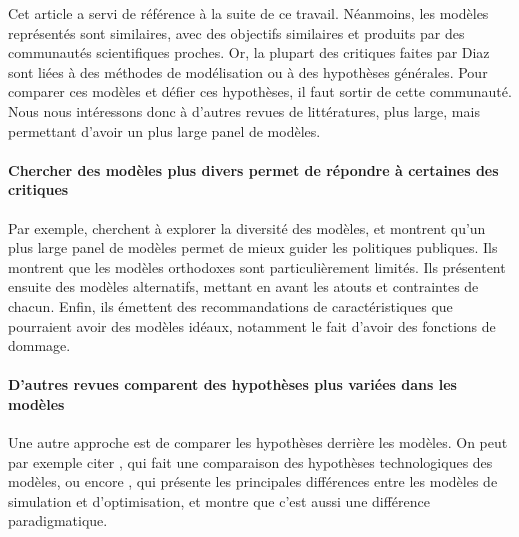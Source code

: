 Cet article a servi de référence à la suite de ce travail. Néanmoins, les modèles représentés sont similaires, avec des objectifs similaires et produits par des communautés scientifiques proches. Or, la plupart des critiques faites par Diaz sont liées à des méthodes de modélisation ou  à des hypothèses générales. Pour comparer ces modèles et défier ces hypothèses, il faut sortir de cette communauté.  \\


Nous nous intéressons donc à d'autres revues de littératures, plus large, mais permettant d'avoir un plus large panel de modèles. 

\paragraph{Chercher des modèles plus divers permet de répondre à certaines des critiques}


Par exemple, \textcite{souffron_successful_2024} cherchent à explorer la diversité des modèles, et montrent qu'un plus large panel de modèles permet de mieux guider les politiques publiques. Ils montrent que les modèles orthodoxes sont particulièrement limités. Ils présentent ensuite des modèles alternatifs, mettant en avant les atouts et contraintes de chacun. Enfin, ils émettent des recommandations de caractéristiques que pourraient avoir des modèles idéaux, notamment le fait d'avoir des fonctions de dommage. 








\paragraph{D'autres revues comparent des hypothèses plus variées dans les modèles}

Une autre approche est de comparer les hypothèses derrière les modèles. On peut par exemple citer \cite{krey_looking_2019}, qui fait une comparaison des hypothèses technologiques des modèles, ou encore \autocite{mercure_modelling_2019}, qui présente les principales différences entre les modèles de simulation et d'optimisation, et montre que c'est aussi une différence paradigmatique. 


